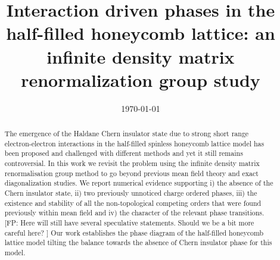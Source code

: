 \documentclass[aps,prx,10pt,twocolumn,floatfix,superscriptaddress,showpacs,numerical,footinbib]{revtex4-1}
\newcommand{\noteAG}[1]{{\color{blue} [AG: #1]}}
\newcommand{\noteFP}[1]{{\color{magenta} [FP: #1]}}
\newcommand{\noteJM}[1]{{\color{red} [JM: #1]}}
\newcommand{\noteFdJ}[1]{{\color{cyan} [FdJ: #1]}}
\begin{document}
%
\title{Interaction driven phases in the half-filled honeycomb lattice: an infinite density matrix renormalization group study}
%
%
\date{\today}
%
\begin{abstract}
%
%
The emergence of the Haldane Chern insulator state due to strong short range electron-electron interactions in the half-filled spinless honeycomb lattice
model has been proposed and challenged with different methods and yet it still remains controversial.
%
In this work we revisit the problem using the infinite density matrix renormalisation group method to go beyond previous mean field theory and exact
diagonalization studies.
%
We report numerical evidence supporting 
i) the absence of the Chern insulator state, 
ii) two previously unnoticed charge ordered phases, 
iii) the existence and stability of all the non-topological competing orders that were found previously within mean field and
iv) the character of the relevant phase transitions.
\noteFP{Here will still have several speculative statements. Should we be a bit more careful here? }
%
Our work establishes the phase diagram of the half-filled honeycomb lattice model tilting the balance
towards the absence of Chern insulator phase for this model.
%
%
\end{abstract}
%
\maketitle
%
\end{document}
